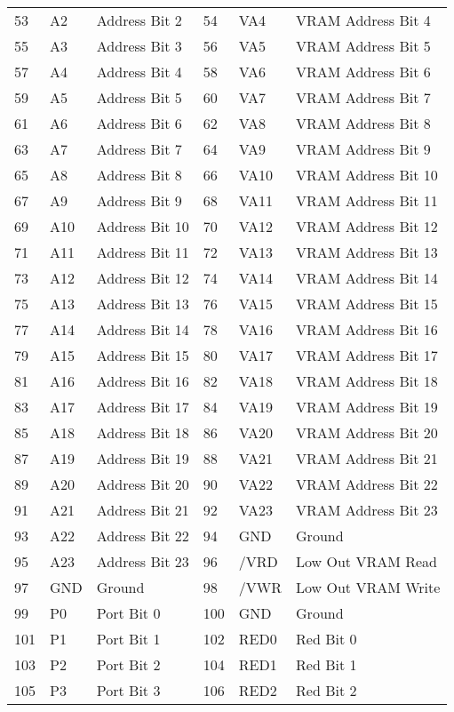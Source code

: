 \documentclass[letterpaper,12pt]{book}
\begin{document}
\begin{tabular}{|l|l|l|l|l|l|}
	53 & A2 & Address Bit 2 & 54 & VA4 & VRAM Address Bit 4\\
	55 & A3 & Address Bit 3 & 56 & VA5 & VRAM Address Bit 5\\
	57 & A4 & Address Bit 4 & 58 & VA6 & VRAM Address Bit 6\\
	59 & A5 & Address Bit 5 & 60 & VA7 & VRAM Address Bit 7\\
	61 & A6 & Address Bit 6 & 62 & VA8 & VRAM Address Bit 8\\
	63 & A7 & Address Bit 7 & 64 & VA9 & VRAM Address Bit 9\\
	65 & A8 & Address Bit 8 & 66 & VA10 & VRAM Address Bit 10\\
	67 & A9 & Address Bit 9 & 68 & VA11 & VRAM Address Bit 11\\
	69 & A10 & Address Bit 10 & 70 & VA12 & VRAM Address Bit 12\\
	71 & A11 & Address Bit 11 & 72 & VA13 & VRAM Address Bit 13\\
	73 & A12 & Address Bit 12 & 74 & VA14 & VRAM Address Bit 14\\
	75 & A13 & Address Bit 13 & 76 & VA15 & VRAM Address Bit 15\\
	77 & A14 & Address Bit 14 & 78 & VA16 & VRAM Address Bit 16\\
	79 & A15 & Address Bit 15 & 80 & VA17 & VRAM Address Bit 17\\
	81 & A16 & Address Bit 16 & 82 & VA18 & VRAM Address Bit 18\\
	83 & A17 & Address Bit 17 & 84 & VA19 & VRAM Address Bit 19\\
	85 & A18 & Address Bit 18 & 86 & VA20 & VRAM Address Bit 20\\
	87 & A19 & Address Bit 19 & 88 & VA21 & VRAM Address Bit 21\\
	89 & A20 & Address Bit 20 & 90 & VA22 & VRAM Address Bit 22\\
	91 & A21 & Address Bit 21 & 92 & VA23 & VRAM Address Bit 23\\
	93 & A22 & Address Bit 22 & 94 & GND & Ground\\
	95 & A23 & Address Bit 23 & 96 & /VRD & Low Out VRAM Read\\
	97 & GND & Ground & 98 & /VWR & Low Out VRAM Write\\
	99 & P0 & Port Bit 0 & 100 & GND & Ground\\
	101 & P1 & Port Bit 1 & 102 & RED0 & Red Bit 0\\
	103 & P2 & Port Bit 2 & 104 & RED1 & Red Bit 1\\
	105 & P3 & Port Bit 3 & 106 & RED2 & Red Bit 2\\

\end{tabular}
\end{document}
